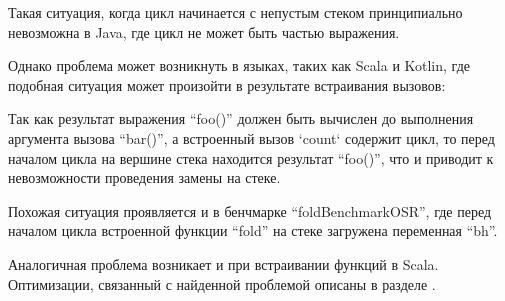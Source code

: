 \begin{verbatim}

\end{verbatim}

Такая ситуация, когда цикл начинается с непустым стеком принципиально невозможна в Java, где
цикл не может быть частью выражения.

Однако проблема может возникнуть в языках, таких как Scala и Kotlin, где подобная ситуация
может произойти в результате встраивания вызовов:

Так как результат выражения ``foo()'' должен быть вычислен до выполнения аргумента вызова
``bar()'', а встроенный вызов `count` содержит цикл, то перед началом цикла на вершине стека
находится результат ``foo()'', что и приводит к невозможности проведения замены на стеке.

Похожая ситуация проявляется и в бенчмарке ``foldBenchmarkOSR'', где перед началом
цикла встроенной функции ``fold'' на стеке загружена переменная ``bh''.

Аналогичная проблема возникает и при встраивании функций в Scala.
Оптимизации, связанный с найденной проблемой описаны в разделе . %
